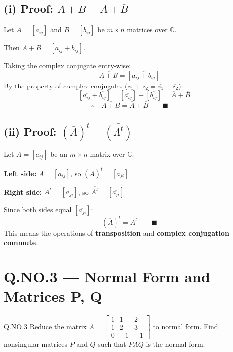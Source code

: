 \documentclass[12pt]{article}
\begin{document}
\subsection{(i) Proof: $\overline{A+B} = \overline{A} + \overline{B}$}

\begin{proofbox}
Let $A = [a_{ij}]$ and $B = [b_{ij}]$ be $m \times n$ matrices over $\mathbb{C}$.

\medskip
Then $A + B = [a_{ij} + b_{ij}]$.

Taking the complex conjugate entry-wise:
\[
  \overline{A+B} = [\overline{a_{ij} + b_{ij}}]
\]
By the property of complex conjugates ($\overline{z_1 + z_2} = \overline{z_1} + \overline{z_2}$):
\[
  = [\overline{a_{ij}} + \overline{b_{ij}}] = [\overline{a_{ij}}] + [\overline{b_{ij}}] = \overline{A} + \overline{B}
\]
\[
  \therefore \quad \overline{A+B} = \overline{A} + \overline{B} \qquad \blacksquare
\]
\end{proofbox}

\subsection{(ii) Proof: $(\overline{A})^t = \overline{(A^t)}$}

\begin{proofbox}
Let $A = [a_{ij}]$ be an $m \times n$ matrix over $\mathbb{C}$.

\medskip
\textbf{Left side:} $\overline{A} = [\overline{a_{ij}}]$, so $(\overline{A})^t = [\overline{a_{ji}}]$

\medskip
\textbf{Right side:} $A^t = [a_{ji}]$, so $\overline{A^t} = [\overline{a_{ji}}]$

\medskip
Since both sides equal $[\overline{a_{ji}}]$:
\[
  (\overline{A})^t = \overline{A^t} \qquad \blacksquare
\]
This means the operations of \textbf{transposition} and \textbf{complex conjugation} \textbf{commute}.
\end{proofbox}

\newpage

\section{Q.NO.3 — Normal Form and Matrices P, Q}

\begin{qbox}{Q.NO.3}
Reduce the matrix $A = \begin{bmatrix}1&1&2\\1&2&3\\0&-1&-1\end{bmatrix}$ to normal form. Find nonsingular matrices $P$ and $Q$ such that $PAQ$ is the normal form.
\end{qbox}
\end{document}
